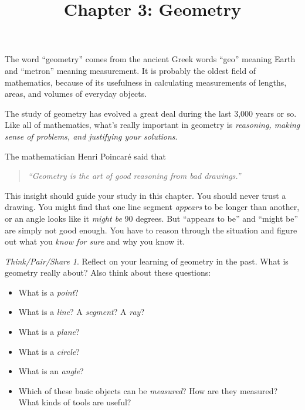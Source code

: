 \documentclass[12pt, reqno]{amsart}
\title{Chapter 3: Geometry}
\theoremstyle{remark}
\newtheorem*{thinkpair*}{Think/Pair/Share}
\theoremstyle{definition}
\numberwithin{equation}{section}  %
\begin{document}
\maketitle

The word ``geometry'' comes from the ancient Greek words ``geo'' meaning Earth and ``metron'' meaning measurement.  It is probably the oldest field of mathematics, because of its usefulness in calculating  measurements of lengths, areas, and volumes of everyday objects.


The study of geometry has evolved a great deal during the last 3,000 years or so.  Like all of mathematics, what's really important in geometry  is \emph{reasoning, making sense of problems, and justifying your solutions}.  

The mathematician Henri Poincar\'e said that 
\begin{quote}
\emph{``Geometry is the art of good reasoning from bad drawings.'' }
\end{quote}
 This insight should guide your study in this chapter.  You should never trust a drawing.  You might find that one line segment \emph{appears} to be longer than another, or an angle looks like it \emph{might be} 90 degrees.  But ``appears to be'' and ``might be'' are simply not good enough.  You have to reason through the situation and figure out what you \emph{know for sure} and why you know it.




\bigskip
\bigskip

 \begin{thinkpair*}
 Reflect on your learning of geometry in the past. What is geometry really about?   Also think about these questions:
 
 \bigskip
 
 
\begin{itemize}
\item
What is a \emph{point}?\\

\item
What is a \emph{line}? A \emph{segment}? A \emph{ray}? \\

\item
What is a \emph{plane}?\\

\item
What is a \emph{circle}? \\

\item
What is an \emph{angle}? \\

\item
Which of these basic objects can be \emph{measured}?  How are they measured?  What kinds of tools are useful?
\end{itemize}
\end{thinkpair*}
\end{document}
